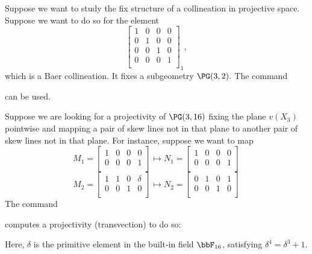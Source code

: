 \bigskip


Suppose we want to study the fix structure of a collineation in projective space. 
Suppose we want to do so for the element 
$$
\left[
\begin{array}{cccc}
1&0&0&0\\
0&1&0&0\\
0&0&1&0\\
0&0&0&1\\
\end{array}
\right]_1,
$$
which is a Baer collineation. It fixes a subgeometry $\PG(3,2).$
The command 
{\tt

}
can be used.


\bigskip



Suppose we are looking for a projectivity of $\PG(3,16)$ fixing the plane $v(X_3)$ pointwise 
and mapping a pair of skew lines not in that plane to another pair of skew lines not in that plane. 
For instance, suppose we want to map 
$$
M_1=\left[
\begin{array}{cccc}
1&0&0&0 \\
0&0&0&1\\
\end{array}
\right]
\mapsto
N_1=\left[
\begin{array}{cccc}
1&0&0&0 \\
0&0&0&1\\
\end{array}
\right]
$$
$$
M_2=\left[
\begin{array}{cccc}
1&1&0&\delta \\
0&0&1&0\\
\end{array}
\right]
\mapsto
N_2=\left[
\begin{array}{cccc}
0&1&0&1 \\
0&0&1&0\\
\end{array}
\right]
$$
The command 
{\tt

}
computes a projectivity (transvection) to do so:
\begin{mdframed}[style=MyFrame]

\end{mdframed}
Here, $\delta$ is the primitive element in the built-in 
field $\bbF_{16}$, satisfying $\delta^4=\delta^3+1.$



\bigskip

